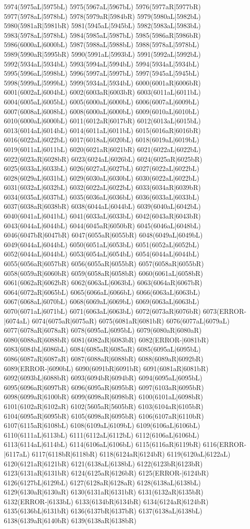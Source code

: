 5974(5975aL|5975bL) 5975(5967aL|5967bL) 5976(5977aR|5977bR) 5977(5978aL|5978bL) 5978(5979aR|5984bR) 5979(5980aL|5982bL) 5980(5981aR|5981bR) 5981(5945aL|5945bL) 5982(5983aL|5983bL) 5983(5978aL|5978bL) 5984(5985aL|5987bL) 5985(5986aR|5986bR) 5986(6000aL|6000bL) 5987(5988aL|5988bL) 5988(5978aL|5978bL) 5989(5990aR|5995bR) 5990(5991aL|5993bL) 5991(5992aL|5992bL) 5992(5934aL|5934bL) 5993(5994aL|5994bL) 5994(5934aL|5934bL) 5995(5996aL|5998bL) 5996(5997aL|5997bL) 5997(5945aL|5945bL) 5998(5999aL|5999bL) 5999(5934aL|5934bL) 6000(6001aR|6006bR) 6001(6002aL|6004bL) 6002(6003aR|6003bR) 6003(6011aL|6011bL) 6004(6005aL|6005bL) 6005(6000aL|6000bL) 6006(6007aL|6009bL) 6007(6008aL|6008bL) 6008(6000aL|6000bL) 6009(6010aL|6010bL) 6010(6000aL|6000bL) 6011(6012aR|6017bR) 6012(6013aL|6015bL) 6013(6014aL|6014bL) 6014(6011aL|6011bL) 6015(6016aR|6016bR) 6016(6022aL|6022bL) 6017(6018aL|6020bL) 6018(6019aL|6019bL) 6019(6011aL|6011bL) 6020(6021aR|6021bR) 6021(6022aL|6022bL) 6022(6023aR|6028bR) 6023(6024aL|6026bL) 6024(6025aR|6025bR) 6025(6033aL|6033bL) 6026(6027aL|6027bL) 6027(6022aL|6022bL) 6028(6029aL|6031bL) 6029(6030aL|6030bL) 6030(6022aL|6022bL) 6031(6032aL|6032bL) 6032(6022aL|6022bL) 6033(6034aR|6039bR) 6034(6035aL|6037bL) 6035(6036aL|6036bL) 6036(6033aL|6033bL) 6037(6038aR|6038bR) 6038(6044aL|6044bL) 6039(6040aL|6042bL) 6040(6041aL|6041bL) 6041(6033aL|6033bL) 6042(6043aR|6043bR) 6043(6044aL|6044bL) 6044(6045aR|6050bR) 6045(6046aL|6048bL) 6046(6047bR|6047bR) 6047(6055aR|6055bR) 6048(6049aL|6049bL) 6049(6044aL|6044bL) 6050(6051aL|6053bL) 6051(6052aL|6052bL) 6052(6044aL|6044bL) 6053(6054aL|6054bL) 6054(6044aL|6044bL) 6055(6056aR|6057bR) 6056(6055aR|6055bR) 6057(6058aR|6055bR) 6058(6059aR|6060bR) 6059(6058aR|6058bR) 6060(6061aL|6058bR) 6061(6062aR|6062bR) 6062(6063aL|6063bL) 6063(6064aR|6067bR) 6064(6072aR|6065bL) 6065(6066aL|6066bL) 6066(6063aL|6063bL) 6067(6068aL|6070bL) 6068(6069aL|6069bL) 6069(6063aL|6063bL) 6070(6071aL|6071bL) 6071(6063aL|6063bL) 6072(6073aR|6076bR) 6073(ERROR-|6074aL) 6074(6075aR|6075aR) 6075(6081aR|6081bR) 6076(6077aL|6079aL) 6077(6078aR|6078aR) 6078(6095aL|6095bL) 6079(6080aR|6080aR) 6080(6088aR|6088bR) 6081(6082aR|6083bR) 6082(ERROR-|6081bR) 6083(6084bL|6086bL) 6084(6085aR|6085aR) 6085(6095aL|6095bL) 6086(6087aR|6087aR) 6087(6088aR|6088bR) 6088(6089aR|6092bR) 6089(ERROR-|6090bL) 6090(6091bR|6091bR) 6091(6081aR|6081bR) 6092(6093bL|6088bR) 6093(6094bR|6094bR) 6094(6095aL|6095bL) 6095(6096aR|6097bR) 6096(6095aR|6095bR) 6097(6103aR|6095bR) 6098(6099aR|6100bR) 6099(6098aR|6098bR) 6100(6101aL|6098bR) 6101(6102aR|6102aR) 6102(5605aR|5605bR) 6103(6104aR|6105bR) 6104(6095aR|6095bR) 6105(6098aR|6095bR) 6106(6107aR|6110bR) 6107(6115aR|6108bL) 6108(6109aL|6109bL) 6109(6106aL|6106bL) 6110(6111aL|6113bL) 6111(6112aL|6112bL) 6112(6106aL|6106bL) 6113(6114aL|6114bL) 6114(6106aL|6106bL) 6115(6116aR|6119bR) 6116(ERROR-|6117aL) 6117(6118bR|6118bR) 6118(6124aR|6124bR) 6119(6120aL|6122aL) 6120(6121aR|6121bR) 6121(6138aL|6138bL) 6122(6123bR|6123bR) 6123(6131aR|6131bR) 6124(6125aR|6126bR) 6125(ERROR-|6124bR) 6126(6127bL|6129bL) 6127(6128aR|6128aR) 6128(6138aL|6138bL) 6129(6130aR|6130aR) 6130(6131aR|6131bR) 6131(6132aR|6135bR) 6132(ERROR-|6133bL) 6133(6134bR|6134bR) 6134(6124aR|6124bR) 6135(6136bL|6131bR) 6136(6137bR|6137bR) 6137(6138aL|6138bL) 6138(6139aR|6140bR) 6139(6138aR|6138bR) 